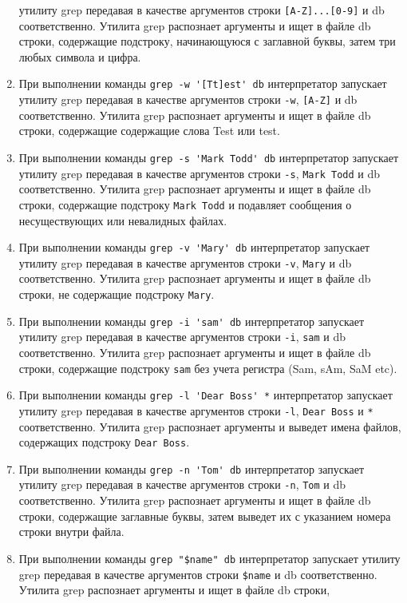 \documentclass[12pt, a4paper]{article}
\begin{document}
\begin{enumerate}
    утилиту grep передавая в качестве аргументов строки \verb|[A-Z]...[0-9]| и db
    соответственно. Утилита grep распознает аргументы и ищет в файле db строки,
    содержащие подстроку, начинающуюся с заглавной буквы, затем три любых символа
    и цифра.
  \item При выполнении команды \verb|grep -w '[Tt]est' db| интерпретатор запускает
    утилиту grep передавая в качестве аргументов строки \verb|-w|, \verb|[A-Z]| и db
    соответственно. Утилита grep распознает аргументы и ищет в файле db строки,
    содержащие содержащие слова Test или test.
  \item При выполнении команды \verb|grep -s 'Mark Todd' db| интерпретатор запускает
    утилиту grep передавая в качестве аргументов строки \verb|-s|, \verb|Mark Todd| и db
    соответственно. Утилита grep распознает аргументы и ищет в файле db строки,
    содержащие подстроку \verb|Mark Todd| и подавляет сообщения о несуществующих
    или невалидных файлах.
  \item При выполнении команды \verb|grep -v 'Mary' db| интерпретатор запускает
    утилиту grep передавая в качестве аргументов строки \verb|-v|, \verb|Mary| и db
    соответственно. Утилита grep распознает аргументы и ищет в файле db строки,
    не содержащие подстроку \verb|Mary|.
  \item При выполнении команды \verb|grep -i 'sam' db| интерпретатор запускает
    утилиту grep передавая в качестве аргументов строки \verb|-i|, \verb|sam| и db
    соответственно. Утилита grep распознает аргументы и ищет в файле db строки,
    содержащие подстроку \verb|sam| без учета регистра (Sam, sAm, SaM etc).
  \item При выполнении команды \verb|grep -l 'Dear Boss' *| интерпретатор запускает
    утилиту grep передавая в качестве аргументов строки \verb|-l|, \verb|Dear Boss| и \verb|*|
    соответственно. Утилита grep распознает аргументы и выведет имена файлов,
    содержащих подстроку \verb|Dear Boss|.
  \item При выполнении команды \verb|grep -n 'Tom' db| интерпретатор запускает
    утилиту grep передавая в качестве аргументов строки \verb|-n|, \verb|Tom| и db
    соответственно. Утилита grep распознает аргументы и ищет в файле db строки,
    содержащие заглавные буквы, затем выведет их с указанием номера строки внутри файла.
  \item При выполнении команды \verb|grep "$name" db| интерпретатор запускает
    утилиту grep передавая в качестве аргументов строки \verb|$name| и db
    соответственно. Утилита grep распознает аргументы и ищет в файле db строки,

\end{enumerate}
\end{document}
